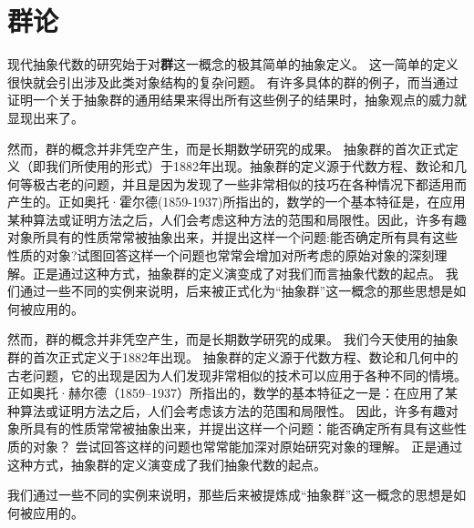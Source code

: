 

\part{群论}
现代抽象代数的研究始于对\textbf{群}这一概念的极其简单的抽象定义。
这一简单的定义很快就会引出涉及此类对象结构的复杂问题。
有许多具体的群的例子，而当通过证明一个关于抽象群的通用结果来得出所有这些例子的结果时，抽象观点的威力就显现出来了。

然而，群的概念并非凭空产生，而是长期数学研究的成果。
抽象群的首次正式定义（即我们所使用的形式）于1882年出现。抽象群的定义源于代数方程、数论和几何等极古老的问题，并且是因为发现了一些非常相似的技巧在各种情况下都适用而产生的。正如奥托·霍尔德(1859-1937)所指出的，数学的一个基本特征是，在应用某种算法或证明方法之后，人们会考虑这种方法的范围和局限性。因此，许多有趣对象所具有的性质常常被抽象出来，并提出这样一个问题:能否确定所有具有这些性质的对象?试图回答这样一个问题也常常会增加对所考虑的原始对象的深刻理解。正是通过这种方式，抽象群的定义演变成了对我们而言抽象代数的起点。
我们通过一些不同的实例来说明，后来被正式化为“抽象群”这一概念的那些思想是如何被应用的。

然而，群的概念并非凭空产生，而是长期数学研究的成果。
我们今天使用的抽象群的首次正式定义于1882年出现。
抽象群的定义源于代数方程、数论和几何中的古老问题，它的出现是因为人们发现非常相似的技术可以应用于各种不同的情境。
正如奥托·赫尔德（1859–1937）所指出的，数学的基本特征之一是：在应用了某种算法或证明方法之后，人们会考虑该方法的范围和局限性。
因此，许多有趣对象所具有的性质常常被抽象出来，并提出这样一个问题：能否确定所有具有这些性质的对象？
尝试回答这样的问题也常常能加深对原始研究对象的理解。
正是通过这种方式，抽象群的定义演变成了我们抽象代数的起点。

我们通过一些不同的实例来说明，那些后来被提炼成“抽象群”这一概念的思想是如何被应用的。

